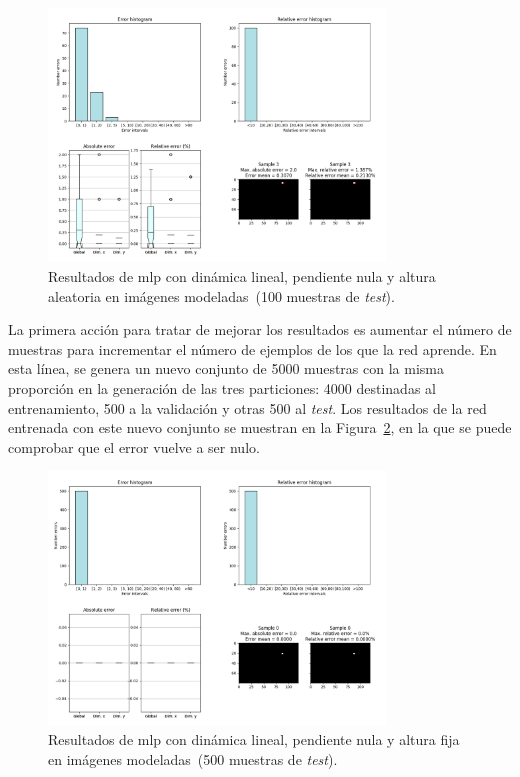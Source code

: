 \begin{figure}[H]
		\begin{center}
			\includegraphics[width=0.8\textwidth]{ figures/test_mod/NOREC/URM_var_1000.png}
			\caption{Resultados de \acrshort{mlp} con dinámica lineal, pendiente nula y altura aleatoria en imágenes modeladas~(100 muestras de \textit{test}).}
			\label{fig.norec_urm_var_1000}
		\end{center}
\end{figure}
\vspace{-10pt}

La primera acción  para tratar de mejorar los resultados es aumentar el número de muestras para incrementar el número de ejemplos de los que la red aprende. En esta línea, se genera un nuevo conjunto de 5000 muestras con la misma proporción en la generación de las tres particiones: 4000 destinadas al entrenamiento, 500 a la validación y otras 500 al \textit{test}. Los resultados de la red entrenada con este nuevo conjunto se muestran en la Figura~\ref{fig.norec_urm_var_5000}, en la que se puede comprobar que el error vuelve a ser nulo.

\begin{figure}[H]
		\begin{center}
			\includegraphics[width=0.8\textwidth]{ figures/test_mod/NOREC/URM_var_5000.png}
			\caption{Resultados de \acrshort{mlp} con dinámica lineal, pendiente nula y altura fija en imágenes modeladas~(500 muestras de \textit{test}).}
			\label{fig.norec_urm_var_5000}
		\end{center}
\end{figure}
\vspace{-10pt}

